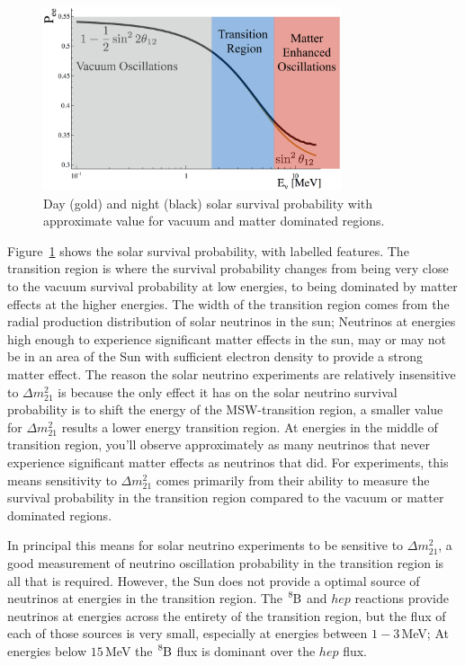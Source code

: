 \begin{figure}[htbp]
    \centering
    \includegraphics[width=0.78\textwidth]{labelled_survival_probability}
    \caption[Labelled Solar Survival Probability]{Day (gold) and night (black) solar survival probability
    with approximate value for vacuum and matter dominated regions.}
    \label{fig:labelled_pee}
\end{figure}

Figure~\ref{fig:labelled_pee} shows the solar survival probability,
with labelled features.
The transition region is where the survival probability changes from
being very close to the vacuum survival probability at low energies,
to being dominated by matter effects at the higher energies.
The width of the transition region comes from the radial production
distribution of solar neutrinos in the sun;
Neutrinos at energies high enough to experience significant matter
effects in the sun, may or may not be in an area of the Sun with sufficient
electron density to provide a strong matter effect.
The reason the solar neutrino experiments are relatively insensitive
to $\Delta m^{2}_{21}$ is because the only effect it has on the
solar neutrino survival probability is to shift the energy
of the MSW-transition region, a smaller value for $\Delta m^{2}_{21}$ results
a lower energy transition region.
At energies in the middle of transition region, you'll observe approximately
as many neutrinos that never experience significant matter effects as neutrinos
that did.
For experiments, this means sensitivity to $\Delta m^{2}_{21}$ comes
primarily from their ability to measure the survival probability in the
transition region compared to the vacuum or matter dominated regions.

In principal this means for solar neutrino experiments to be sensitive
to $\Delta m^{2}_{21}$, a good measurement of neutrino oscillation probability
in the transition region is all that is required.
However, the Sun does not provide a optimal source of neutrinos at energies
in the transition region.
The $\ce{^{8}B}$ and $hep$ reactions provide neutrinos at energies across the
entirety of the transition region, but the flux of each of those sources is
very small, especially at energies between $1-3$\,MeV\@;
At energies below $15$\,MeV the $\ce{^{8}B}$ flux is dominant over the $hep$
flux.

